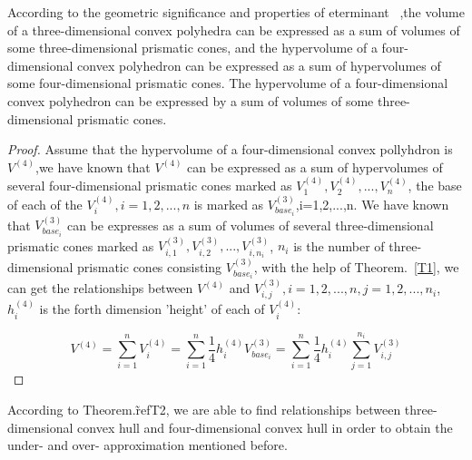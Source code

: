 \documentclass[runningheads]{llncs}
\begin{document}
\begin{theorem}\label{T2}
According to the geometric significance and properties of eterminant~\cite{ref_article1} ,the volume of a three-dimensional convex polyhedra can be expressed as a sum of volumes of some three-dimensional prismatic cones, and the hypervolume of a four-dimensional convex polyhedron can be expressed as a sum of hypervolumes of some four-dimensional prismatic cones. The hypervolume of a four-dimensional convex polyhedron can be expressed by a sum of volumes of some three-dimensional prismatic cones.

\begin{proof}
Assume that the hypervolume of a four-dimensional convex pollyhdron is $V^{(4)}$,we have known that $V^{(4)}$ can be expressed as a sum of hypervolumes of several four-dimensional prismatic cones marked as $V^{(4)}_{1},V^{(4)}_{2},...,V^{(4)}_{n}$, the base of each of the $V^{(4)}_{i},i=1,2,...,n$ is marked as $V^{(3)}_{base_{i}}$,i=1,2,...,n. We have known that $V^{(3)}_{base_{i}}$ can be expresses as a sum of volumes of several three-dimensional prismatic cones marked as $V^{(3)}_{i,1},V^{(3)}_{i,2},...,V^{(3)}_{i,n_{i}}$, $n_{i}$ is the number of three-dimensional prismatic cones consisting $V^{(3)}_{base_{i}}$, with the help of Theorem.~\ref{T1}, we can get the relationships between $V^{(4)}$ and $V^{(3)}_{i,j},i=1,2,...,n,j=1,2,...,n_{i}$,$h^{(4)}_{i}$ is the forth dimension 'height' of each of $V^{(4)}_{i}$:

\begin{equation}\label{E}
V^{(4)}=\sum_{i=1}^{n}V^{(4)}_{i}=\sum_{i=1}^{n}\frac{1}{4}h^{(4)}_{i}V^{(3)}_{base_{i}}=\sum_{i=1}^{n}\frac{1}{4}h^{(4)}_{i}\sum_{j=1}^{n_{i}}V^{(3)}_{i,j}
\end{equation}

\end{proof}
\end{theorem}

According to Theorem.\~ref{T2}, we are able to find relationships between three-dimensional convex hull and four-dimensional convex hull in order to obtain the under- and over- approximation mentioned before.
\end{document}
